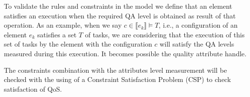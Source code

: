To validate the rules and constraints in the model we define that an element satisfies an execution when the required QA level is obtained as result of that operation. As an example, when we say $c \in  \llbracket e_k \rrbracket \models T$, i.e., a configuration of an element $e_k$ satisfies a set $T$ of tasks,  we are considering that the execution of this set of tasks by the element with the configuration $c$ will satisfy the QA levels measured during this execution. It becomes possible the quality attribute handle.

The constraints combination with the attributes level measurement will be checked with the using of a Constraint Satisfaction Problem (CSP) to check satisfaction of QoS. 

